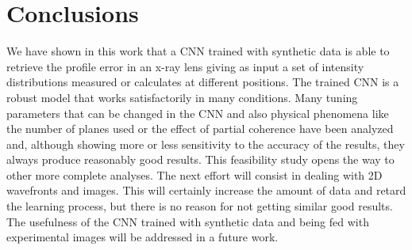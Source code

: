 \documentclass{iucr}
\begin{document}
\section{Conclusions}\label{sec:conclusions}

We have shown in this work that a CNN trained with synthetic data is able to retrieve the profile error in an x-ray lens giving as input a set of intensity distributions measured or calculates at different positions. The trained CNN is a robust model that works satisfactorily in many conditions. Many tuning parameters that can be changed in the CNN and also physical phenomena like the number of planes used or the effect of partial coherence have been analyzed and, although showing more or less sensitivity to the accuracy of the results, they always produce reasonably good results. This feasibility study opens the way to other more complete analyses. The next effort will consist in dealing with 2D wavefronts and images. This will certainly increase the amount of data and retard the learning process, but there is no reason for not getting similar good results. The usefulness of the CNN trained with synthetic data and being fed with  experimental images will be addressed in a future work.  

\end{document}
